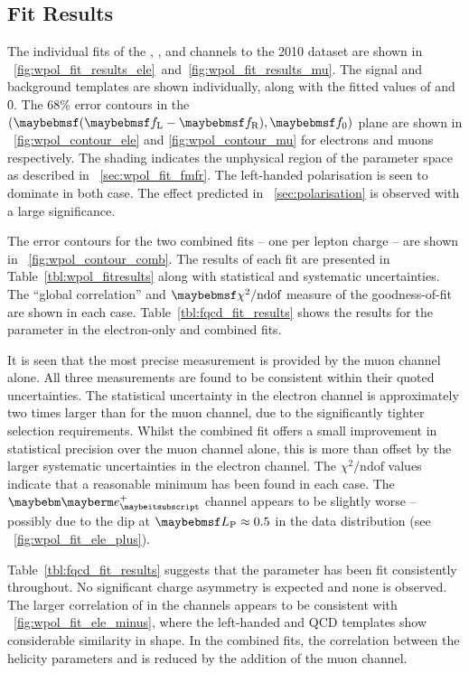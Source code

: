 \subsection{Fit Results}
The individual fits of the \Pep, \Pem, \Pgmp and \Pgmm channels to the 2010
dataset are shown in
\figs~\ref{fig:wpol_fit_results_ele}~and~\ref{fig:wpol_fit_results_mu}. The
signal and background templates are shown individually, along with the fitted
values of \fLmfR and \f0. The 68\% error contours in the $(\fLmfR, \f0)$ plane
are shown in \figs~\ref{fig:wpol_contour_ele} and \ref{fig:wpol_contour_mu} for
electrons and muons respectively. The shading indicates the unphysical region of
the parameter space as described in \sec~\ref{sec:wpol_fit_fmfr}. The
left-handed polarisation is seen to dominate in both case. The effect predicted
in \sec~\ref{sec:polarisation} is observed with a large significance.

The error contours for the two combined fits -- one per lepton charge -- are
shown in \fig~\ref{fig:wpol_contour_comb}. The results of each fit are presented
in Table~\ref{tbl:wpol_fitresults} along with statistical and systematic
uncertainties. The ``global correlation'' and $\chisq/\textrm{ndof}$ measure of
the goodness-of-fit are shown in each case. Table~\ref{tbl:fqcd_fit_results}
shows the results for the parameter \fQCD in the electron-only and combined
fits.

It is seen that the most precise measurement is provided by the muon channel
alone. All three measurements are found to be consistent within their quoted
uncertainties. The statistical uncertainty in the electron channel is
approximately two times larger than for the muon channel, due to the
significantly tighter selection requirements. Whilst the combined fit offers a
small improvement in statistical precision over the muon channel alone, this is
more than offset by the larger systematic uncertainties in the electron
channel. The $\chi^2/\textrm{ndof}$ values indicate that a reasonable minimum
has been found in each case. The $\Pep$ channel appears to be slightly worse --
possibly due to the dip at $\LP \approx 0.5$ in the data distribution (see
\fig~\ref{fig:wpol_fit_ele_plus}).

Table~\ref{tbl:fqcd_fit_results} suggests that the parameter \fQCD has been fit
consistently throughout. No significant charge asymmetry is expected and none is
observed. The larger correlation of \fLmfR in the \PWm channels appears to be
consistent with \fig~\ref{fig:wpol_fit_ele_minus}, where the left-handed and
\ac{QCD} templates show considerable similarity in shape. In the combined fits,
the correlation between the helicity parameters and \fQCD is reduced by the
addition of the muon channel.

